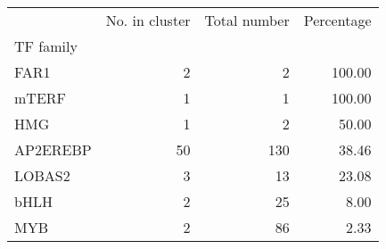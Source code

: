\begin{tabular}{lrrr}
\toprule
{} &  No. in cluster &  Total number &  Percentage \\
TF family &                 &               &             \\
\midrule
FAR1      &               2 &             2 &      100.00 \\
mTERF     &               1 &             1 &      100.00 \\
HMG       &               1 &             2 &       50.00 \\
AP2EREBP  &              50 &           130 &       38.46 \\
LOBAS2    &               3 &            13 &       23.08 \\
bHLH      &               2 &            25 &        8.00 \\
MYB       &               2 &            86 &        2.33 \\
\bottomrule
\end{tabular}
